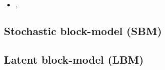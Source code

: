 \begin{itemize}
 \item \cite{LDV15}, \cite{MPD14}
\end{itemize}


\subsection{Stochastic block-model (SBM)}

\subsection{Latent block-model (LBM)}
